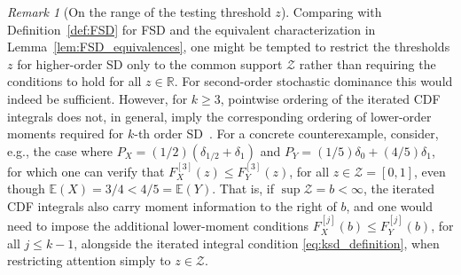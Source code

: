 \documentclass[12pt,twoside]{article}
\theoremstyle{plain}
\theoremstyle{definition}
\theoremstyle{remark}
\newtheorem{remark}{Remark}
\newcommand{\R}{\mathbb{R}}
\newcommand{\calZ}{\mathcal{Z}}
\newcommand{\Esymb}{\mathbb{E}}
\begin{document}
\begin{remark}[On the range of the testing threshold $z$] Comparing with Definition~\ref{def:FSD} for FSD and the equivalent characterization in Lemma~\ref{lem:FSD_equivalences}, 
one might be tempted to restrict the thresholds $z$ for higher-order SD only to the common support $\calZ$ rather than requiring the conditions to hold for all $z\in \R$. For second-order stochastic dominance this would indeed be sufficient.
However, for $k\geq 3$, pointwise ordering of the iterated CDF integrals does not, in general, imply the corresponding ordering of lower-order moments required for $k$-th order SD~\citep{whitmore1970third,fishburn1976continua}.
For a concrete counterexample, consider, e.g., the case where $P_X=(1/2)(\delta_{1/2}+\delta_{1})$ and $P_Y=(1/5)\delta_{0}+(4/5)\delta_{1}$, for which one can verify that $F_X^{[3]}(z)\leq F_Y^{[3]}(z)$, for all $z\in \calZ=[0,1]$, even though $\Esymb(X)=3/4<4/5=\Esymb(Y)$. 
That is, if $\sup \calZ=b<\infty$, the iterated CDF integrals also carry moment information to the right of $b$, and one would need to impose the additional lower-moment conditions $F_X^{[j]}(b) \leq F_Y^{[j]}(b)$, for all $j \leq k-1$, alongside the iterated integral condition \eqref{eq:ksd_definition}, when restricting attention simply to $z\in \calZ$.
\end{remark}
\end{document}
